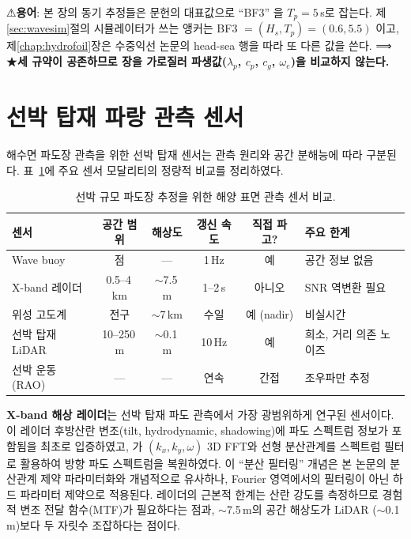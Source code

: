 \documentclass[11pt]{report}
\numberwithin{equation}{chapter}
\numberwithin{figure}{chapter}
\numberwithin{table}{chapter}
\begin{document}
⚠\textbf{용어}: 본 장의 동기 추정들은 문헌의 대표값으로 ``BF3'' 을 $T_p = 5$\,s로
잡는다. 제\ref{sec:wavesim}절의 시뮬레이터가 쓰는 앵커는 BF3 $= (H_s, T_p) = (0.6, 5.5)$
이고, 제\ref{chap:hydrofoil}장은 수중익선 논문의 head-sea 행을 따라 또 다른 값을 쓴다.
⟹ ★\textbf{세 규약이 공존하므로 장을 가로질러 파생값($\lambda_p$, $c_p$, $c_g$,
$\omega_e$)을 비교하지 않는다.}

\section{선박 탑재 파랑 관측 센서}
\label{sec:wave_sensing}

해수면 파도장 관측을 위한 선박 탑재 센서는 관측 원리와 공간 분해능에 따라
구분된다. 표~\ref{tab:sensor_comparison}에 주요 센서 모달리티의 정량적 비교를
정리하였다.

\begin{table}[htbp]
\centering
\caption{선박 규모 파도장 추정을 위한 해양 표면 관측 센서 비교.}
\label{tab:sensor_comparison}
\small
\begin{tabular}{lccccl}
\toprule
센서 & 공간 범위 & 해상도 & 갱신 속도 & 직접 파고? & 주요 한계 \\
\midrule
Wave buoy & 점 & --- & 1\,Hz & 예 & 공간 정보 없음 \\
X-band 레이더 & 0.5--4\,km & $\sim$7.5\,m & 1--2\,s & 아니오 & SNR 역변환 필요 \\
위성 고도계 & 전구 & $\sim$7\,km & 수일 & 예 (nadir) & 비실시간 \\
선박 탑재 LiDAR & 10--250\,m & $\sim$0.1\,m & 10\,Hz & 예 & 희소, 거리 의존 노이즈 \\
선박 운동 (RAO) & --- & --- & 연속 & 간접 & 조우파만 추정 \\
\bottomrule
\end{tabular}
\end{table}

\textbf{X-band 해상 레이더}는 선박 탑재 파도 관측에서 가장 광범위하게 연구된 센서이다.
\citet{Young1985}이 레이더 후방산란 변조(tilt, hydrodynamic, shadowing)에
파도 스펙트럼 정보가 포함됨을 최초로 입증하였고,
\citet{nieto2004}가 $(k_x, k_y, \omega)$ 3D FFT와
선형 분산관계를 스펙트럼 필터로 활용하여 방향 파도 스펙트럼을 복원하였다.
이 ``분산 필터링'' 개념은 본 논문의 분산관계 제약 파라미터화와 개념적으로
유사하나, Fourier 영역에서의 필터링이 아닌 하드 파라미터 제약으로 적용된다.
레이더의 근본적 한계는 산란 강도를 측정하므로 경험적 변조 전달 함수(MTF)가
필요하다는 점과, $\sim$7.5\,m의 공간 해상도가 LiDAR ($\sim$0.1\,m)보다
두 자릿수 조잡하다는 점이다.
\end{document}
